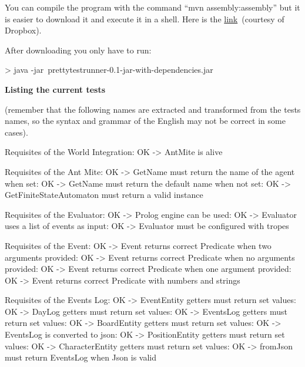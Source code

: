 \documentclass[a4paper]{article}
\newcommand\textstyleStrongEmphasis[1]{\textbf{#1}}
\begin{document}
You can compile the program with the command {\textquotedblleft}mvn
assembly:assembly{\textquotedblright} but it is easier to download it
and execute it in a shell. Here is the
\href{https://www.dropbox.com/s/g95az0lv2tqn7b1/prettytestrunner-0.1-jar-with-dependencies.jar?dl=0}{link}~(courtesy
of Dropbox).

After downloading you only have to run:

{\textgreater} java -jar~prettytestrunner-0.1-jar-with-dependencies.jar

\textstyleStrongEmphasis{Listing the current tests}

(remember that the following names are extracted and transformed from
the tests names, so the syntax and grammar of the English may not be
correct in some cases).

Requisites of the World Integration: OK -{\textgreater} AntMite is alive

Requisites of the Ant Mite: OK -{\textgreater} GetName must return the name of the agent when
set: OK -{\textgreater} GetName must return the default name when not
set: OK -{\textgreater} GetFiniteStateAutomaton must return a valid
instance

Requisites of the Evaluator: OK -{\textgreater} Prolog engine can be used: OK -{\textgreater} Evaluator uses a list of events as input: OK -{\textgreater} Evaluator must be configured with tropes

Requisites of the Event: OK -{\textgreater} Event returns correct Predicate when two arguments
provided: OK -{\textgreater} Event returns correct Predicate when no arguments
provided: OK -{\textgreater} Event returns correct Predicate when one argument
provided: OK -{\textgreater} Event returns correct Predicate with numbers and
strings

Requisites of the Events Log: OK -{\textgreater} EventEntity getters must return set values: OK -{\textgreater} DayLog getters must return set values: OK -{\textgreater} EventsLog getters must return set values: OK -{\textgreater} BoardEntity getters must return set values: OK -{\textgreater} EventsLog is converted to json: OK -{\textgreater} PositionEntity getters must return set
values: OK -{\textgreater} CharacterEntity getters must return set
values: OK -{\textgreater} fromJson must return EventsLog when Json is valid
\end{document}
